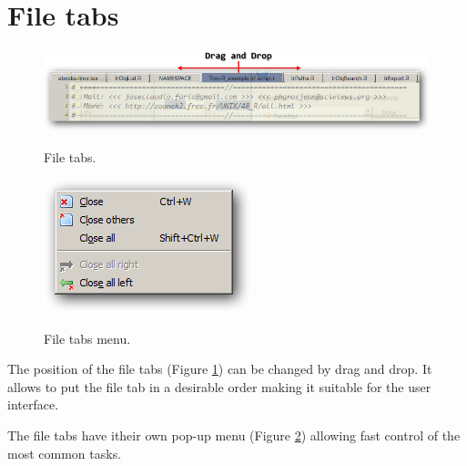 
\hypertarget{working_filetabs}{}
\section{File tabs}

\begin{figure}[h!]
  \includegraphics[scale=0.35]{./res/filetabs.png}\\
  \caption{File tabs.}
  \label{fig:filetabs}
\end{figure}

\begin{figure}[h!]
  \includegraphics[scale=0.35]{./res/filetabs_menu.png}\\
  \caption{File tabs menu.}
  \label{fig:filetabs_menu}
\end{figure}

The position of the file tabs
(Figure \ref{fig:filetabs})
can be changed by drag and drop. It allows to
put the file tab in a desirable order making it suitable for the user interface.

The file tabs have itheir own pop-up menu
(Figure \ref{fig:filetabs_menu})
allowing fast control of the most common tasks.
